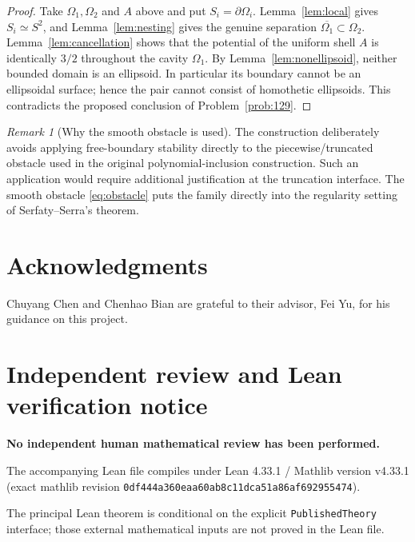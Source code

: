 \documentclass[11pt]{article}
\theoremstyle{definition}
\theoremstyle{remark}
\newtheorem{remark}[theorem]{Remark}
\newcommand{\Om}{\Omega}
\newcommand{\1}{\mathbf{1}}
\begin{document}
\begin{proof}
Take $\Om_1,\Om_2$ and $A$ above and put $S_i=\partial\Om_i$. Lemma~\ref{lem:local} gives $S_i\simeq S^2$, and Lemma~\ref{lem:nesting} gives the genuine separation $\overline{\Om_1}\subset\Om_2$. Lemma~\ref{lem:cancellation} shows that the potential of the uniform shell $A$ is identically $3/2$ throughout the cavity $\Om_1$. By Lemma~\ref{lem:nonellipsoid}, neither bounded domain is an ellipsoid. In particular its boundary cannot be an ellipsoidal surface; hence the pair cannot consist of homothetic ellipsoids. This contradicts the proposed conclusion of Problem~\ref{prob:129}.
\end{proof}

\begin{remark}[Why the smooth obstacle is used]
The construction deliberately avoids applying free-boundary stability directly to the piecewise/truncated obstacle used in the original polynomial-inclusion construction. Such an application would require additional justification at the truncation interface. The smooth obstacle \eqref{eq:obstacle} puts the family directly into the regularity setting of Serfaty--Serra's theorem.
\end{remark}


\section*{Acknowledgments}
Chuyang Chen and Chenhao Bian are grateful to their advisor, Fei Yu, for his guidance on this project.

\section*{Independent review and Lean verification notice}
\begingroup
\small
\begin{center}
\begin{minipage}{0.94\linewidth}
\centering
\textbf{\large No independent human mathematical review has been performed.}
\end{minipage}
\end{center}

\medskip
\noindent The accompanying Lean file compiles under Lean 4.33.1 / Mathlib version v4.33.1 (exact mathlib revision \texttt{0df444a360eaa60ab8c11dca51a86af692955474}).

\medskip
\noindent The principal Lean theorem is conditional on the explicit \texttt{PublishedTheory} interface; those external mathematical inputs are not proved in the Lean file.
\end{document}
